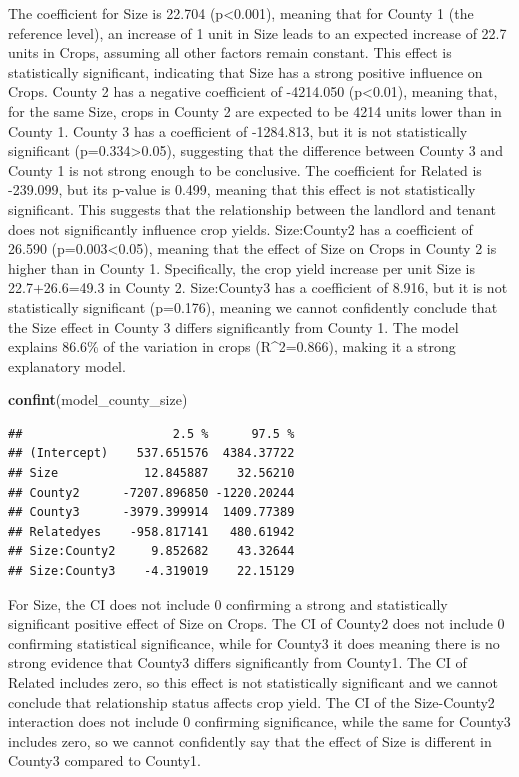 \documentclass[
  11pt,
]{article}
\newenvironment{Shaded}{\begin{snugshade}}{\end{snugshade}}
\newcommand{\FunctionTok}[1]{\textcolor[rgb]{0.13,0.29,0.53}{\textbf{#1}}}
\newcommand{\NormalTok}[1]{#1}
\begin{document}
The coefficient for Size is 22.704 (p\textless0.001), meaning that for
County 1 (the reference level), an increase of 1 unit in Size leads to
an expected increase of 22.7 units in Crops, assuming all other factors
remain constant. This effect is statistically significant, indicating
that Size has a strong positive influence on Crops. County 2 has a
negative coefficient of -4214.050 (p\textless0.01), meaning that, for
the same Size, crops in County 2 are expected to be 4214 units lower
than in County 1. County 3 has a coefficient of -1284.813, but it is not
statistically significant (p=0.334\textgreater0.05), suggesting that the
difference between County 3 and County 1 is not strong enough to be
conclusive. The coefficient for Related is -239.099, but its p-value is
0.499, meaning that this effect is not statistically significant. This
suggests that the relationship between the landlord and tenant does not
significantly influence crop yields. Size:County2 has a coefficient of
26.590 (p=0.003\textless0.05), meaning that the effect of Size on Crops
in County 2 is higher than in County 1. Specifically, the crop yield
increase per unit Size is 22.7+26.6=49.3 in County 2. Size:County3 has a
coefficient of 8.916, but it is not statistically significant (p=0.176),
meaning we cannot confidently conclude that the Size effect in County 3
differs significantly from County 1. The model explains 86.6\% of the
variation in crops (R\^{}2=0.866), making it a strong explanatory model.

\begin{Shaded}
\begin{Highlighting}[]
\FunctionTok{confint}\NormalTok{(model\_county\_size)}
\end{Highlighting}
\end{Shaded}

\begin{verbatim}
##                     2.5 %      97.5 %
## (Intercept)    537.651576  4384.37722
## Size            12.845887    32.56210
## County2      -7207.896850 -1220.20244
## County3      -3979.399914  1409.77389
## Relatedyes    -958.817141   480.61942
## Size:County2     9.852682    43.32644
## Size:County3    -4.319019    22.15129
\end{verbatim}

For Size, the CI does not include 0 confirming a strong and
statistically significant positive effect of Size on Crops. The CI of
County2 does not include 0 confirming statistical significance, while
for County3 it does meaning there is no strong evidence that County3
differs significantly from County1. The CI of Related includes zero, so
this effect is not statistically significant and we cannot conclude that
relationship status affects crop yield. The CI of the Size-County2
interaction does not include 0 confirming significance, while the same
for County3 includes zero, so we cannot confidently say that the effect
of Size is different in County3 compared to County1.
\end{document}
